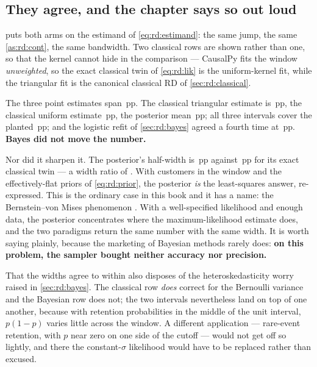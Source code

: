 

\subsection*{They agree, and the chapter says so out loud}

 puts both arms on the estimand of \cref{eq:rd:estimand}: the same jump, the
same \cref{as:rd:cont}, the same bandwidth. Two classical rows are shown rather than one, so that
the kernel cannot hide in the comparison --- CausalPy fits the window \emph{unweighted}, so the
exact classical twin of \cref{eq:rd:lik} is the uniform-kernel fit, while the triangular fit is the
canonical classical RD of \cref{sec:rd:classical}.

The three point estimates span \nbNineEstSpan{}\,pp. The classical triangular estimate is
\nbNineRd{}\,pp, the classical uniform estimate \nbNineUnif{}\,pp, the posterior mean
\nbNineBayes{}\,pp; all three intervals cover the planted \nbNineTrueJump{}\,pp; and the logistic
refit of \cref{sec:rd:bayes} agreed a fourth time at \nbNineLogitJump{}\,pp. \textbf{Bayes did not
move the number.}

Nor did it sharpen it. The posterior's half-width is \nbNineBayesHalf{}\,pp against
\nbNineUnifHalf{}\,pp for its exact classical twin --- a width ratio of \nbNineWidthRatio{}. With
\nbNineNWindow{} customers in the window and the effectively-flat priors of \cref{eq:rd:prior}, the
posterior \emph{is} the least-squares answer, re-expressed. This is the ordinary case in this book
and it has a name: the Bernstein--von Mises phenomenon \citep{gelman2013}. With a well-specified
likelihood and enough data, the posterior concentrates where the maximum-likelihood estimate does,
and the two paradigms return the same number with the same width. It is worth saying plainly,
because the marketing of Bayesian methods rarely does: \textbf{on this problem, the sampler bought
neither accuracy nor precision.}

That the widths agree to within \nbNineWidthRatio{} also disposes of the heteroskedasticity worry
raised in \cref{sec:rd:bayes}. The classical row \emph{does} correct for the Bernoulli variance and
the Bayesian row does not; the two intervals nevertheless land on top of one another, because with
retention probabilities in the middle of the unit interval, $p(1-p)$ varies little across the
window. A different application --- rare-event retention, with $p$ near zero on one side of the
cutoff --- would not get off so lightly, and there the constant-$\sigma$ likelihood would have to be
replaced rather than excused.

